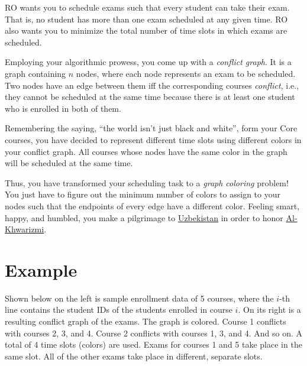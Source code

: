\documentclass[a4paper]{exam}
\begin{document}
RO wants you to schedule exams such that every student can take their exam. That is, no student has more than one exam scheduled at any given time. RO also wants you to minimize the total number of time slots in which exams are scheduled.

Employing your algorithmic prowess, you come up with a \textit{conflict graph}. It is a graph containing $n$ nodes, where each node represents an exam to be scheduled. Two nodes have an edge between them iff the corresponding courses \textit{conflict}, i.e., they cannot be scheduled at the same time because there is at least one student who is enrolled in both of them.

Remembering the saying, ``the world isn't just black and white'', form your Core courses, you have decided to represent different time slots using different colors in your conflict graph. All courses whose nodes have the same color in the graph will be scheduled at the same time.

Thus, you have transformed your scheduling task to a \textit{graph coloring} problem! You just have to figure out the minimum number of colors to assign to your nodes such that the endpoints of every edge have a different color. Feeling smart, happy, and humbled, you make a pilgrimage to \href{https://en.wikipedia.org/wiki/Al-Khwarizmi_Complex}{Uzbekistan} in order to honor \href{https://www.openculture.com/2022/04/why-algorithms-are-called-algorithms.html}{Al-Khwarizmi}.


\section*{Example}

Shown below on the left is sample enrollment data of 5 courses, where the $i$-th line contains the student IDs of the students enrolled in course $i$. On its right is a resulting conflict graph of the exams. The graph is colored. Course 1 conflicts with courses 2, 3, and 4. Course 2 conflicts with courses 1, 3, and 4. And so on. A total of 4 time slots (colors) are used. Exams for courses 1 and 5 take place in the same slot. All of the other exams take place in different, separate slots.
\bigskip
\end{document}
